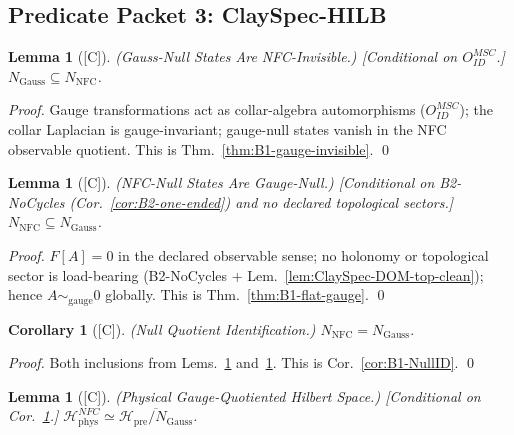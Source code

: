 \documentclass[12pt,oneside]{amsbook}
\theoremstyle{plain}
\newtheorem{lemma}[theorem]{Lemma}
\newtheorem{corollary}[theorem]{Corollary}
\theoremstyle{definition}
\theoremstyle{remark}
\newcommand{\status}[1]{\textup{[#1]}}
\begin{document}
\subsection{Predicate Packet 3: ClaySpec-HILB}

\begin{lemma}[\status{C}]\label{lem:ClaySpec-HILB-GaussInvisible}
\textup{(Gauss-Null States Are NFC-Invisible.)}
\textup{[Conditional on $O_{ID}^{MSC}$.]}
$N_{\mathrm{Gauss}}\subseteq N_{\mathrm{NFC}}$.
\end{lemma}

\begin{proof}
Gauge transformations act as collar-algebra automorphisms
($O_{ID}^{MSC}$); the collar Laplacian is gauge-invariant; gauge-null
states vanish in the NFC observable quotient. This is
Thm.~\ref{thm:B1-gauge-invisible}.
\qed
\end{proof}

\begin{lemma}[\status{C}]\label{lem:ClaySpec-HILB-FlatGauge}
\textup{(NFC-Null States Are Gauge-Null.)}
\textup{[Conditional on B2-NoCycles
(Cor.~\ref{cor:B2-one-ended}) and no declared topological sectors.]}
$N_{\mathrm{NFC}}\subseteq N_{\mathrm{Gauss}}$.
\end{lemma}

\begin{proof}
$F[A]=0$ in the declared observable sense; no holonomy or topological
sector is load-bearing (B2-NoCycles + Lem.~\ref{lem:ClaySpec-DOM-top-clean});
hence $A\sim_{\mathrm{gauge}}0$ globally. This is Thm.~\ref{thm:B1-flat-gauge}.
\qed
\end{proof}

\begin{corollary}[\status{C}]\label{cor:ClaySpec-HILB-NullID}
\textup{(Null Quotient Identification.)}
$N_{\mathrm{NFC}}=N_{\mathrm{Gauss}}$.
\end{corollary}

\begin{proof}
Both inclusions from Lems.~\ref{lem:ClaySpec-HILB-GaussInvisible}
and~\ref{lem:ClaySpec-HILB-FlatGauge}. This is Cor.~\ref{cor:B1-NullID}.
\qed
\end{proof}

\begin{lemma}[\status{C}]\label{lem:ClaySpec-HILB-PhysicalSpace}
\textup{(Physical Gauge-Quotiented Hilbert Space.)}
\textup{[Conditional on Cor.~\ref{cor:ClaySpec-HILB-NullID}.]}
$\mathcal{H}^{NFC}_{\mathrm{phys}}\simeq
\overline{\mathcal{H}_{\mathrm{pre}}/N_{\mathrm{Gauss}}}$.
\end{lemma}
\end{document}
